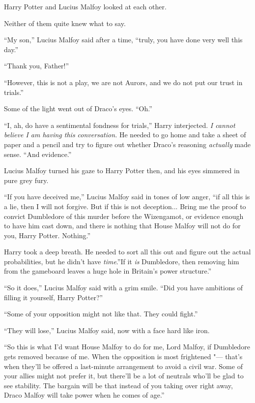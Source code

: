Harry Potter and Lucius Malfoy looked at each other.

Neither of them quite knew what to say.

``My son,'' Lucius Malfoy said after a time, ``truly, you have done very
well this day.''

``Thank you, Father!''

``However, this is not a play, we are not Aurors, and we do not put our
trust in trials.''

Some of the light went out of Draco's eyes. ``Oh.''

``I, ah, do have a sentimental fondness for trials,'' Harry interjected.
\emph{I cannot believe I am having this conversation.} He needed to go
home and take a sheet of paper and a pencil and try to figure out
whether Draco's reasoning \emph{actually} made sense. ``And evidence.''

Lucius Malfoy turned his gaze to Harry Potter then, and his eyes
simmered in pure grey fury.

``If you have deceived me,'' Lucius Malfoy said in tones of low anger,
``if all this is a lie, then I will not forgive. But if this is not
deception... Bring me the proof to convict Dumbledore of this
murder before the Wizengamot, or evidence enough to have him cast down,
and there is nothing that House Malfoy will not do for you, Harry
Potter. Nothing.''

Harry took a deep breath. He needed to sort all this out and figure out
the actual probabilities, but he didn't have \emph{time}.''If it
\emph{is} Dumbledore, then removing him from the gameboard leaves a huge
hole in Britain's power structure.''

``So it does,'' Lucius Malfoy said with a grim smile. ``Did you have
ambitions of filling it yourself, Harry Potter?''

``Some of your opposition might not like that. They could fight.''

``They will lose,'' Lucius Malfoy said, now with a face hard like iron.

``So this is what I'd want House Malfoy to do for me, Lord Malfoy, if
Dumbledore gets removed because of me. When the opposition is most
frightened "--- that's when they'll be offered a last-minute arrangement to
avoid a civil war. Some of your allies might not prefer it, but there'll
be a lot of neutrals who'll be glad to see stability. The bargain will
be that instead of you taking over right away, Draco Malfoy will take
power when he comes of age.''

